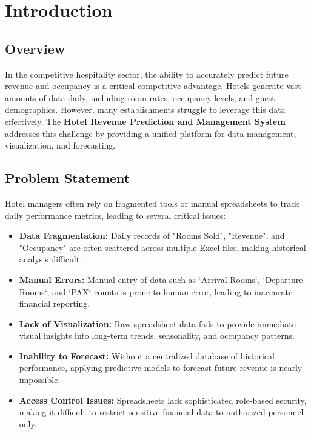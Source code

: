\documentclass[letterpaper,11pt]{report}
\begin{document}
\newpage

\tableofcontents

\newpage
\mbox{}

\chapter{Introduction}\label{chapter:introduction}
\pagestyle{fancy}
\setcounter{page}{1}
\onehalfspacing

\section{Overview}
In the competitive hospitality sector, the ability to accurately predict future revenue and occupancy is a critical competitive advantage. Hotels generate vast amounts of data daily, including room rates, occupancy levels, and guest demographics. However, many establishments struggle to leverage this data effectively. The \textbf{Hotel Revenue Prediction and Management System} addresses this challenge by providing a unified platform for data management, visualization, and forecasting.

\section{Problem Statement}
Hotel managers often rely on fragmented tools or manual spreadsheets to track daily performance metrics, leading to several critical issues:
\begin{itemize}
    \item \textbf{Data Fragmentation:} Daily records of "Rooms Sold", "Revenue", and "Occupancy" are often scattered across multiple Excel files, making historical analysis difficult.
    \item \textbf{Manual Errors:} Manual entry of data such as `Arrival Rooms`, `Departure Rooms`, and `PAX` counts is prone to human error, leading to inaccurate financial reporting.
    \item \textbf{Lack of Visualization:} Raw spreadsheet data fails to provide immediate visual insights into long-term trends, seasonality, and occupancy patterns.
    \item \textbf{Inability to Forecast:} Without a centralized database of historical performance, applying predictive models to forecast future revenue is nearly impossible.
    \item \textbf{Access Control Issues:} Spreadsheets lack sophisticated role-based security, making it difficult to restrict sensitive financial data to authorized personnel only.
\end{itemize}
\end{document}
